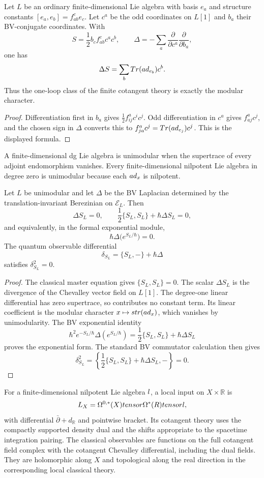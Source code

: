 \begin{proposition}
Let $L$ be an ordinary finite-dimensional Lie algebra with basis $e_a$ and structure constants $[e_a,e_b]=f^c_{ab}e_c$. Let $c^a$ be the odd coordinates on $L[1]$ and $b_a$ their BV-conjugate coordinates. With
\[
 S=\frac12 b_c f^c_{ab}c^ac^b,
 \qquad
 \Delta=-\sum_a\frac{\partial}{\partial c^a}
                 \frac{\partial}{\partial b_a},
\]
one has
\[
 \Delta S=\sum_bTr(ad_{e_b})c^b.
\]
Thus the one-loop class of the finite cotangent theory is exactly the modular character.
\end{proposition}
\begin{proof}
Differentiation first in $b_a$ gives $\frac12f^a_{ij}c^ic^j$. Odd differentiation in $c^a$ gives $f^a_{aj}c^j$, and the chosen sign in $\Delta$ converts this to $f^a_{ja}c^j=Tr(ad_{e_j})c^j$. This is the displayed formula.
\end{proof}

A finite-dimensional dg Lie algebra is unimodular when the supertrace of every adjoint endomorphism vanishes. Every finite-dimensional nilpotent Lie algebra in degree zero is unimodular because each $ad_x$ is nilpotent.

\begin{theorem}
Let $L$ be unimodular and let $\Delta$ be the BV Laplacian determined by the translation-invariant Berezinian on $\mathcal E_L$. Then
\[
 \Delta S_L=0,
 \qquad
 \frac12\{S_L,S_L\}+\hbar\Delta S_L=0,
\]
and equivalently, in the formal exponential module,
\[
 \hbar\Delta\bigl(e^{S_L/\hbar}\bigr)=0.
\]
The quantum observable differential
\[
 \delta_{S_L}=\{S_L,-\}+\hbar\Delta
\]
satisfies $\delta_{S_L}^2=0$.
\end{theorem}
\begin{proof}
The classical master equation gives $\{S_L,S_L\}=0$. The scalar $\Delta S_L$ is the divergence of the Chevalley vector field on $L[1]$. The degree-one linear differential has zero supertrace, so contributes no constant term. Its linear coefficient is the modular character $x\mapsto str(ad_x)$, which vanishes by unimodularity. The BV exponential identity
\[
 \hbar^2e^{-S_L/\hbar}\Delta(e^{S_L/\hbar})
 =\frac12\{S_L,S_L\}+\hbar\Delta S_L
\]
proves the exponential form. The standard BV commutator calculation then gives
\[
 \delta_{S_L}^2=\left\{\frac12\{S_L,S_L\}+\hbar\Delta S_L,-\right\}=0.
\]
\end{proof}

For a finite-dimensional nilpotent Lie algebra $l$, a local input on
$X\times\mathbb R$ is
\[
 L_X=\Omega^{0,*}(X)tensor\Omega^*(R)tensorl,
\]
with differential $\bar\partial+d_{\mathbb R}$ and pointwise bracket.
Its cotangent theory uses the compactly supported density dual and the shifts
appropriate to the spacetime integration pairing.
The classical observables are functions on the full cotangent field complex
with the cotangent Chevalley differential, including the dual fields.
They are holomorphic along $X$ and topological along the real direction in
the corresponding local classical theory.

